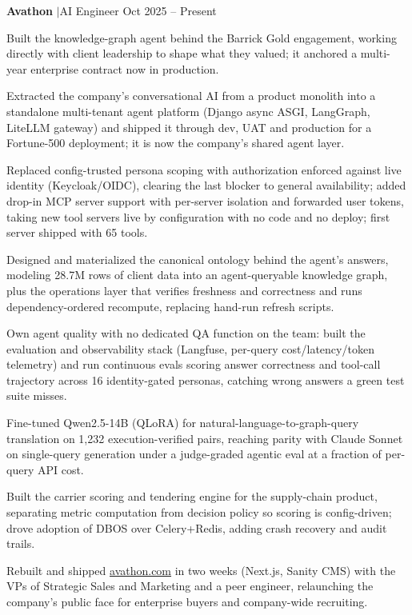\documentclass[letterpaper,10.5pt]{article}
\let\olditemize\itemize
\let\oldenditemize\enditemize
\renewenvironment{itemize}{%
  \olditemize
  \setlength{\itemsep}{1pt}%
  \setlength{\parskip}{0pt}%
  \setlength{\parsep}{0pt}%
  \setlength{\topsep}{1.5pt}%
  \setlength{\leftmargin}{1.2em}%
}{\oldenditemize}
\begin{document}
{\small
\textbf{Avathon} \enspace$\vert$\enspace AI Engineer \hfill Oct 2025 -- Present
\begin{itemize}
  \item Built the knowledge-graph agent behind the Barrick Gold engagement, working directly with client leadership to shape what they valued; it anchored a multi-year enterprise contract now in production.
  \item Extracted the company's conversational AI from a product monolith into a standalone multi-tenant agent platform (Django async ASGI, LangGraph, LiteLLM gateway) and shipped it through dev, UAT and production for a Fortune-500 deployment; it is now the company's shared agent layer.
  \item Replaced config-trusted persona scoping with authorization enforced against live identity (Keycloak/OIDC), clearing the last blocker to general availability; added drop-in MCP server support with per-server isolation and forwarded user tokens, taking new tool servers live by configuration with no code and no deploy; first server shipped with 65 tools.
  \item Designed and materialized the canonical ontology behind the agent's answers, modeling 28.7M rows of client data into an agent-queryable knowledge graph, plus the operations layer that verifies freshness and correctness and runs dependency-ordered recompute, replacing hand-run refresh scripts.
  \item Own agent quality with no dedicated QA function on the team: built the evaluation and observability stack (Langfuse, per-query cost/latency/token telemetry) and run continuous evals scoring answer correctness and tool-call trajectory across 16 identity-gated personas, catching wrong answers a green test suite misses.
  \item Fine-tuned Qwen2.5-14B (QLoRA) for natural-language-to-graph-query translation on 1{,}232 execution-verified pairs, reaching parity with Claude Sonnet on single-query generation under a judge-graded agentic eval at a fraction of per-query API cost.
  \item Built the carrier scoring and tendering engine for the supply-chain product, separating metric computation from decision policy so scoring is config-driven; drove adoption of DBOS over Celery+Redis, adding crash recovery and audit trails.
  \item Rebuilt and shipped \href{https://avathon.com}{avathon.com} in two weeks (Next.js, Sanity CMS) with the VPs of Strategic Sales and Marketing and a peer engineer, relaunching the company's public face for enterprise buyers and company-wide recruiting.
\end{itemize}

}
\end{document}
